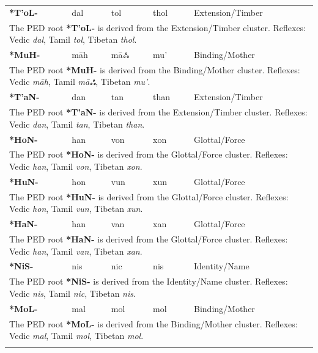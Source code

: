\begin{longtable}{p{} p{} p{} p{} p{}}
\textbf{*T'oL-} & dal & tol & thol & Extension/Timber \\ 
\multicolumn{5}{p{\textwidth}}{\small The PED root \textbf{*T'oL-} is derived from the Extension/Timber cluster. Reflexes: Vedic \textit{dal}, Tamil \textit{tol}, Tibetan \textit{thol}. } \\ \addlinespace 
\textbf{*MuH-} & māh & māஃ & mu' & Binding/Mother \\ 
\multicolumn{5}{p{\textwidth}}{\small The PED root \textbf{*MuH-} is derived from the Binding/Mother cluster. Reflexes: Vedic \textit{māh}, Tamil \textit{māஃ}, Tibetan \textit{mu'}. } \\ \addlinespace 
\textbf{*T'aN-} & dan & tan & than & Extension/Timber \\ 
\multicolumn{5}{p{\textwidth}}{\small The PED root \textbf{*T'aN-} is derived from the Extension/Timber cluster. Reflexes: Vedic \textit{dan}, Tamil \textit{tan}, Tibetan \textit{than}. } \\ \addlinespace 
\textbf{*HoN-} & han & von & xon & Glottal/Force \\ 
\multicolumn{5}{p{\textwidth}}{\small The PED root \textbf{*HoN-} is derived from the Glottal/Force cluster. Reflexes: Vedic \textit{han}, Tamil \textit{von}, Tibetan \textit{xon}. } \\ \addlinespace 
\textbf{*HuN-} & hon & vun & xun & Glottal/Force \\ 
\multicolumn{5}{p{\textwidth}}{\small The PED root \textbf{*HuN-} is derived from the Glottal/Force cluster. Reflexes: Vedic \textit{hon}, Tamil \textit{vun}, Tibetan \textit{xun}. } \\ \addlinespace 
\textbf{*HaN-} & han & van & xan & Glottal/Force \\ 
\multicolumn{5}{p{\textwidth}}{\small The PED root \textbf{*HaN-} is derived from the Glottal/Force cluster. Reflexes: Vedic \textit{han}, Tamil \textit{van}, Tibetan \textit{xan}. } \\ \addlinespace 
\textbf{*NiS-} & nis & nic & nis & Identity/Name \\ 
\multicolumn{5}{p{\textwidth}}{\small The PED root \textbf{*NiS-} is derived from the Identity/Name cluster. Reflexes: Vedic \textit{nis}, Tamil \textit{nic}, Tibetan \textit{nis}. } \\ \addlinespace 
\textbf{*MoL-} & mal & mol & mol & Binding/Mother \\ 
\multicolumn{5}{p{\textwidth}}{\small The PED root \textbf{*MoL-} is derived from the Binding/Mother cluster. Reflexes: Vedic \textit{mal}, Tamil \textit{mol}, Tibetan \textit{mol}. } \\ \addlinespace 

\end{longtable}
